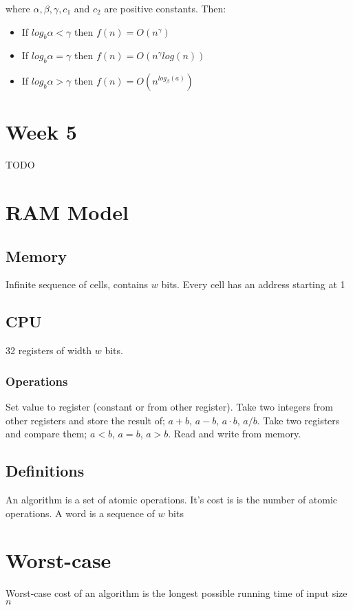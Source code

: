 \documentclass[5pt,a4paper]{article}
\begin{document}
\begin{multicols}{3}
where $\alpha, \beta, \gamma, c_1$ and $c_2$ are positive constants. Then:

\begin{itemize}
\item If $log_{b} \alpha < \gamma$ then $f(n) = O(n^\gamma)$
\item If $log_{b} \alpha = \gamma$ then $f(n) = O(n^\gamma log(n))$
\item If $log_{b} \alpha > \gamma$ then $f(n) = O(n^{log_\beta(a)})$

\end{itemize}
\section{Week 5}

TODO

\section{RAM Model}
\subsection{Memory}
Infinite sequence of cells, contains $w$ bits. Every cell has an address starting at 1
\subsection{CPU}
32 registers of width $w$ bits.
\subsubsection{Operations}
Set value to register (constant or from other register). Take two integers from other registers and store the result of; $a+b$, $a-b$, $a\cdot b$, $a/b$. Take two registers and compare them; $a<b$, $a=b$, $a>b$. Read and write from memory.
\subsection{Definitions}
An algorithm is a set of atomic operations. It's cost is is the number of atomic operations. A word is a sequence of $w$ bits
\section{Worst-case}
Worst-case cost of an algorithm is the longest possible running time of input size $n$

\end{multicols}
\end{document}
